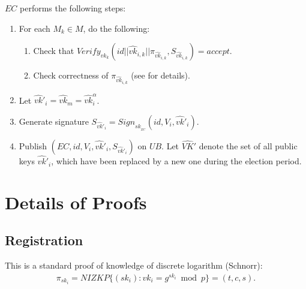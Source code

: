 \documentclass[bibtotoc,halfparskip,oneside]{scrreprt}
\newcommand{\eid}{\mathit{id}\xspace}
\newcommand{\sk}[1]{\mathit{sk}_{#1}\xspace}
\newcommand{\vk}[1]{\mathit{vk}_{#1}\xspace}
\newcommand{\vkhat}[1]{\hat{\mathit{vk}}_{#1}\xspace}
\newcommand{\vkhatprime}[1]{\hat{\mathit{vk}}'_{#1}\xspace}
\newcommand{\SK}[1]{\sk{_#1}\xspace}
\newcommand{\EC}{\ensuremath{\mathit{EC}}\xspace}
\newcommand{\UB}{\ensuremath{\mathit{UB}}\xspace}
\newcommand{\Mixer}[1]{\ensuremath{\mathit{M}_{#1}}\xspace}
\newcommand{\Voter}[1]{\ensuremath{\mathit{V}_{#1}}\xspace}
\begin{document}
\EC performs the following steps:
\begin{enumerate}[resume]
	\item For each $\Mixer{k}\in M$, do the following:
	\begin{enumerate}
		\item Check that $\mathit{Verify}_{\vk{k}}(\eid||\vkhat{i,k}||\pi_{\vkhat{i,k}},S_{\vkhat{i,k}})=\mathit{accept}$.
		\item Check correctness of $\pi_{\vkhat{i,k}}$ (see  for details).
	\end{enumerate}
	\item Let $\vkhatprime{i}=\vkhat{m}=\vkhat{i}^{\alpha}$.
	\item Generate signature $S_{\vkhatprime{i}}=\mathit{Sign}_{\SK{\EC}}(\eid,\Voter{i},\vkhatprime{i})$.
	\item Publish $(\EC,\eid,\Voter{i},\vkhatprime{i},S_{\vkhatprime{i}})$ on \UB. Let $\hat{\mathit{VK}}'$ denote the set of all public keys $\vkhatprime{i}$, which have been replaced by a new one during the election period.
\end{enumerate}



\section{Details of Proofs}

\subsection{Registration}\label{proof_reg}

This is a standard proof of knowledge of discrete logarithm (Schnorr):
\begin{align*}
\pi_{\sk{i}}=\mathit{NIZKP}\{(\sk{i}):\vk{i}=g^{\sk{i}}\bmod{p}\}=(t,c,s).
\end{align*}
\end{document}
